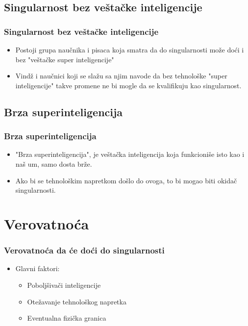 \documentclass{beamer}
\begin{document}
\subsection{Singularnost bez veštačke inteligencije}
\begin{frame}[fragile]\frametitle{Singularnost bez veštačke inteligencije}
	\begin{itemize}	
        \item Postoji grupa naučnika i pisaca koja smatra da do singularnosti može doći i bez "veštačke super inteligencije"
        \item Vindž i naučnici koji se slažu sa njim navode da bez tehnološke "super inteligencije" takve promene ne bi mogle da se kvalifikuju kao singularnost.
	\end{itemize}
\end{frame}

\subsection{Brza superinteligencija}
\begin{frame}[fragile]\frametitle{Brza superinteligencija}
	\begin{itemize}	
        \item "Brza superinteligencija", je veštačka inteligencija koja funkcioniše isto kao i naš um, samo dosta brže.
        \item Ako bi se tehnološkim napretkom došlo do ovoga, to bi mogao biti okidač singularnosti.
	\end{itemize}
\end{frame}
\section{Verovatnoća}

\begin{frame}[fragile]\frametitle{Verovatnoća da će doći do singularnosti}
    \begin{itemize}	
        \item Glavni faktori:
        \begin{itemize}	
            \item Poboljšivači inteligencije
            \item Otežavanje tehnološkog napretka
            \item Eventualna fizička granica
      \end{itemize}
    \end{itemize}
\end{frame}
\end{document}
